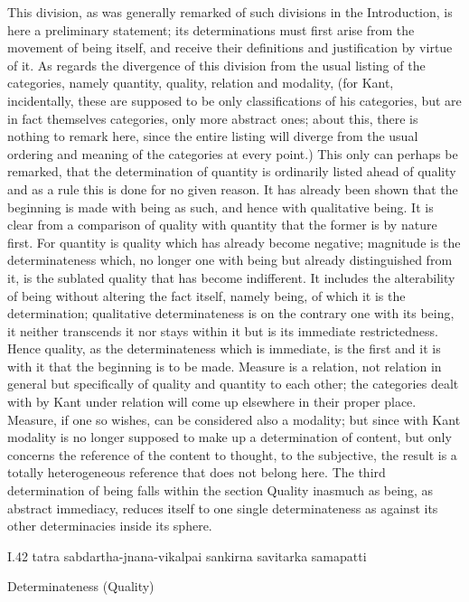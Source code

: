 This division, as was generally remarked of such divisions in the
Introduction, is here a preliminary statement;
its determinations must first arise from the movement of being itself,
and receive their definitions and justification by virtue of it.
As regards the divergence of this division from the usual listing
of the categories,  namely quantity, quality, relation and modality,
(for Kant, incidentally, these are supposed to be only classifications
of his categories, but are in fact themselves categories,
only more abstract ones; about this, there is nothing to remark here,
since the entire listing will diverge from the usual ordering and meaning
of the categories at every point.)
This only can perhaps be remarked, that the determination of quantity
is ordinarily listed ahead of quality and as a rule
this is done for no given reason.
It has already been shown that the beginning is made with being as such,
and hence with qualitative being.
It is clear from a comparison of quality with quantity that
the former is by nature first.
For quantity is quality which has already become negative;
magnitude is the determinateness which, no longer one with being but
already distinguished from it, is the sublated quality
that has become indifferent.
It includes the alterability of being without altering the fact itself,
namely being, of which it is the determination;
qualitative determinateness is on the contrary one with its being,
it neither transcends it nor stays within it
but is its immediate restrictedness.
Hence quality, as the determinateness which is immediate,
is the first and it is with it that the beginning is to be made.
Measure is a relation, not relation in general but specifically
of quality and quantity to each other;
the categories dealt with by Kant under relation
will come up elsewhere in their proper place.
Measure, if one so wishes, can be considered also a modality;
but since with Kant modality is no longer supposed to make up
a determination of content, but only concerns the reference of
the content to thought, to the subjective, the result is a
totally heterogeneous reference that does not belong here.
The third determination of being falls within the section Quality
inasmuch as being, as abstract immediacy, reduces itself to
one single determinateness as against its other determinacies
inside its sphere.

I.42
tatra sabdartha-jnana-vikalpai sankirna savitarka samapatti

Determinateness (Quality)

